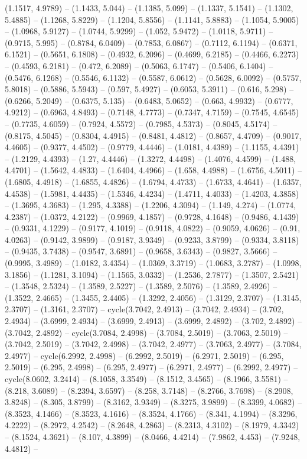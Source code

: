 (1.1517, 4.9789) -- (1.1433, 5.044) -- (1.1385, 5.099) -- (1.1337, 5.1541) -- (1.1302, 5.4885) -- (1.1268, 5.8229) -- (1.1204, 5.8556) -- (1.1141, 5.8883) -- (1.1054, 5.9005) -- (1.0968, 5.9127) -- (1.0744, 5.9299) -- (1.052, 5.9472) -- (1.0118, 5.9711) -- (0.9715, 5.995) -- (0.8784, 6.0409) -- (0.7853, 6.0867) -- (0.7112, 6.1194) -- (0.6371, 6.1521) -- (0.5651, 6.1808) -- (0.4932, 6.2096) -- (0.4699, 6.2185) -- (0.4466, 6.2273) -- (0.4593, 6.2181) -- (0.472, 6.2089) -- (0.5063, 6.1747) -- (0.5406, 6.1404) -- (0.5476, 6.1268) -- (0.5546, 6.1132) -- (0.5587, 6.0612) -- (0.5628, 6.0092) -- (0.5757, 5.8018) -- (0.5886, 5.5943) -- (0.597, 5.4927) -- (0.6053, 5.3911) -- (0.616, 5.298) -- (0.6266, 5.2049) -- (0.6375, 5.135) -- (0.6483, 5.0652) -- (0.663, 4.9932) -- (0.6777, 4.9212) -- (0.6963, 4.8493) -- (0.7148, 4.7773) -- (0.7347, 4.7159) -- (0.7545, 4.6545) -- (0.7735, 4.6059) -- (0.7924, 4.5572) -- (0.7985, 4.5373) -- (0.8045, 4.5174) -- (0.8175, 4.5045) -- (0.8304, 4.4915) -- (0.8481, 4.4812) -- (0.8657, 4.4709) -- (0.9017, 4.4605) -- (0.9377, 4.4502) -- (0.9779, 4.4446) -- (1.0181, 4.4389) -- (1.1155, 4.4391) -- (1.2129, 4.4393) -- (1.27, 4.4446) -- (1.3272, 4.4498) -- (1.4076, 4.4599) -- (1.488, 4.4701) -- (1.5642, 4.4833) -- (1.6404, 4.4966) -- (1.658, 4.4988) -- (1.6756, 4.5011) -- (1.6805, 4.4918) -- (1.6855, 4.4826) -- (1.6794, 4.4733) -- (1.6733, 4.4641) -- (1.6357, 4.4538) -- (1.5981, 4.4435) -- (1.5346, 4.4234) -- (1.4711, 4.4033) -- (1.4203, 4.3858) -- (1.3695, 4.3683) -- (1.295, 4.3388) -- (1.2206, 4.3094) -- (1.149, 4.274) -- (1.0774, 4.2387) -- (1.0372, 4.2122) -- (0.9969, 4.1857) -- (0.9728, 4.1648) -- (0.9486, 4.1439) -- (0.9331, 4.1229) -- (0.9177, 4.1019) -- (0.9118, 4.0822) -- (0.9059, 4.0626) -- (0.91, 4.0263) -- (0.9142, 3.9899) -- (0.9187, 3.9349) -- (0.9233, 3.8799) -- (0.9334, 3.8118) -- (0.9435, 3.7438) -- (0.9547, 3.6891) -- (0.9658, 3.6343) -- (0.9827, 3.5666) -- (0.9995, 3.4989) -- (1.0182, 3.4354) -- (1.0369, 3.3719) -- (1.0683, 3.2787) -- (1.0998, 3.1856) -- (1.1281, 3.1094) -- (1.1565, 3.0332) -- (1.2536, 2.7877) -- (1.3507, 2.5421) -- (1.3548, 2.5324) -- (1.3589, 2.5227) -- (1.3589, 2.5076) -- (1.3589, 2.4926) -- (1.3522, 2.4665) -- (1.3455, 2.4405) -- (1.3292, 2.4056) -- (1.3129, 2.3707) -- (1.3145, 2.3707) -- (1.3161, 2.3707) -- cycle(3.7042, 2.4913) -- (3.7042, 2.4934) -- (3.702, 2.4934) -- (3.6999, 2.4934) -- (3.6999, 2.4913) -- (3.6999, 2.4892) -- (3.702, 2.4892) -- (3.7042, 2.4892) -- cycle(3.7084, 2.4998) -- (3.7084, 2.5019) -- (3.7063, 2.5019) -- (3.7042, 2.5019) -- (3.7042, 2.4998) -- (3.7042, 2.4977) -- (3.7063, 2.4977) -- (3.7084, 2.4977) -- cycle(6.2992, 2.4998) -- (6.2992, 2.5019) -- (6.2971, 2.5019) -- (6.295, 2.5019) -- (6.295, 2.4998) -- (6.295, 2.4977) -- (6.2971, 2.4977) -- (6.2992, 2.4977) -- cycle(8.0602, 3.2414) -- (8.1058, 3.3549) -- (8.1512, 3.4565) -- (8.1966, 3.5581) -- (8.218, 3.6089) -- (8.2394, 3.6597) -- (8.258, 3.7148) -- (8.2766, 3.7698) -- (8.2908, 3.8248) -- (8.305, 3.8799) -- (8.3162, 3.9349) -- (8.3275, 3.9899) -- (8.3399, 4.0682) -- (8.3523, 4.1466) -- (8.3523, 4.1616) -- (8.3524, 4.1766) -- (8.341, 4.1994) -- (8.3296, 4.2222) -- (8.2972, 4.2542) -- (8.2648, 4.2863) -- (8.2313, 4.3102) -- (8.1979, 4.3342) -- (8.1524, 4.3621) -- (8.107, 4.3899) -- (8.0466, 4.4214) -- (7.9862, 4.453) -- (7.9248, 4.4812) -- 